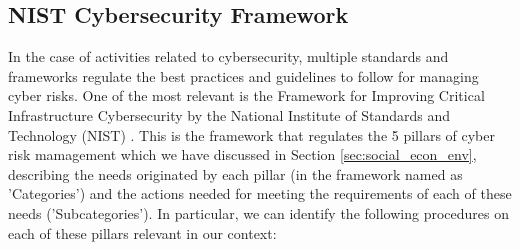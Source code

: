 \subsection{NIST Cybersecurity Framework}
In the case of activities related to cybersecurity, multiple standards and
frameworks regulate the best practices and guidelines to follow for
managing cyber risks. One of the most relevant is the Framework for
Improving Critical Infrastructure Cybersecurity by the National Institute
of Standards and Technology (NIST) \cite{nist_cyber}. This is the framework
that regulates the 5 pillars of cyber risk mamagement which we have
discussed in Section \ref{sec:social_econ_env}, describing the needs
originated by each pillar (in the framework named as 'Categories') and the
actions needed for meeting the requirements of each of these needs
('Subcategories'). In particular, we can identify the following procedures
on each of these pillars relevant in our context:
